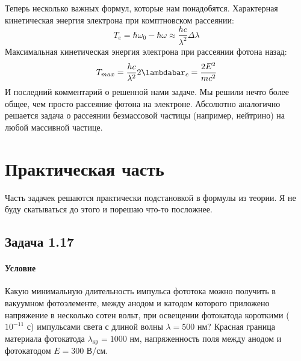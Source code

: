 \documentclass[12pt]{article}
\begin{document}
Теперь несколько важных формул, которые нам понадобятся. Характерная кинетическая энергия электрона при комптновском рассеянии:
\begin{equation*}
    T_e = \hbar\omega_0 - \hbar\omega \approx \dfrac{hc}{\lambda^2}\Delta\lambda
\end{equation*}
Максимальная кинетическая энергия электрона при рассеянии фотона назад:
\begin{equation*}
    T_{max} =  \dfrac{hc}{\lambda^2}2\lambdabar_c = \dfrac{2E^2}{mc^2}
\end{equation*}
И последний комментарий о решенной нами задаче. Мы решили нечто более общее, чем просто рассеяние фотона на электроне. Абсолютно аналогично решается задача о рассеянии безмассовой частицы (например, нейтрино) на любой массивной частице.

\section{Практическая часть}
Часть задачек решаются практически подстановкой в формулы из теории. Я не буду скатываться до этого и порешаю что-то посложнее.

\subsection{Задача 1.17}

\label{task_117}
\paragraph{Условие} Какую минимальную длительность импульса фототока можно получить в вакуумном фотоэлементе, между анодом и катодом которого приложено напряжение в несколько сотен вольт, при освещении фотокатода короткими ($10^{-11}$ с) импульсами света с длиной волны $\lambda = 500$ нм? Красная граница материала фотокатода $\lambda_{\text{кр}} = 1000$ нм, напряженность поля между анодом и фотокатодом $E= 300$ В/см.
\end{document}
